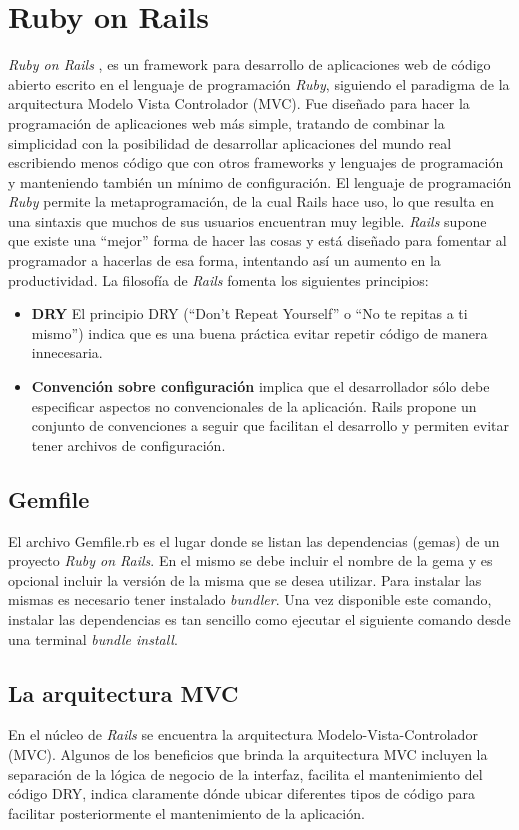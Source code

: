 \section{Ruby on Rails}
\emph{Ruby on Rails} \cite{rubyonrails}, es un framework para desarrollo de aplicaciones web de código abierto escrito en el lenguaje de programación \emph{Ruby}, siguiendo el paradigma de la arquitectura Modelo Vista Controlador (MVC). Fue diseñado para hacer la programación de aplicaciones web más simple, tratando de combinar la simplicidad con la posibilidad de desarrollar aplicaciones del mundo real escribiendo menos código que con otros frameworks y lenguajes de programación y manteniendo también un mínimo de configuración. El lenguaje de programación \emph{Ruby} permite la metaprogramación, de la cual Rails hace uso, lo que resulta en una sintaxis que muchos de sus usuarios encuentran muy legible.
\emph{Rails} supone que existe una ``mejor'' forma de hacer las cosas y está diseñado para fomentar al programador a hacerlas de esa forma, intentando así un aumento en la productividad.
La filosofía de \emph{Rails} fomenta los siguientes principios:
\begin{itemize}
\item
\textbf{DRY} El principio DRY (``Don't Repeat Yourself'' o ``No te repitas a ti mismo'') indica que es una buena práctica evitar repetir código de manera innecesaria.
\item
\textbf{Convención sobre configuración} implica que el desarrollador sólo debe especificar aspectos no convencionales de la aplicación. Rails propone un conjunto de convenciones a seguir que facilitan el desarrollo y permiten evitar tener archivos de configuración.

\end{itemize}

\subsection{Gemfile}

El archivo Gemfile.rb es el  lugar donde se listan las dependencias (gemas) de un proyecto \emph{Ruby on Rails}. En el mismo se debe incluir el nombre de la gema y es opcional incluir la
versión de la misma que se desea utilizar. Para instalar las mismas es necesario tener instalado \emph{bundler}. Una vez disponible este comando, instalar las dependencias es tan 
sencillo como ejecutar el siguiente comando desde una terminal \emph{bundle install}.

\subsection{La arquitectura MVC}
En el núcleo de \emph{Rails} se encuentra la arquitectura Modelo-Vista-Controlador (MVC). Algunos de los beneficios que brinda la arquitectura MVC incluyen la separación de la lógica de negocio de la interfaz, facilita el mantenimiento del código DRY, indica claramente dónde ubicar diferentes tipos de código para facilitar posteriormente el mantenimiento de la aplicación.
